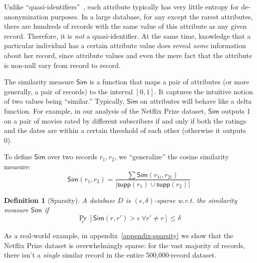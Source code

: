 \documentclass[11pt]{article}
\newcommand{\Sim}{\textsf{Sim}}
\newcommand{\supp}{\textsf{supp}}
\newtheorem{definition}{Definition}
\begin{document}
Unlike ``quasi-identifiers''~\cite{ksweeney,ciriani}, each attribute
typically has very little entropy for de-anonymization purposes.  In a
large database, for any except the rarest attributes, there are hundreds
of records with the same value of this attribute as any given record.
Therefore, it is \emph{not} a quasi-identifier.  At the same time,
knowledge that a particular individual has a certain attribute value
does reveal \emph{some} information about her record, since attribute
values and even the mere fact that the attribute is non-null vary from
record to record.


The similarity measure $\Sim$ is a function that maps a pair of attributes
(or more generally, a pair of records) to the interval $[0,1]$.  It captures the
intuitive notion of two values being ``similar.''  Typically, $\Sim$
on attributes will behave like a delta function.  For example, in our
analysis of the Netflix Prize dataset, $\Sim$ outputs 1 on a pair of
movies rated by different subscribers if and only if both the ratings
and the dates are within a certain threshold of each other (otherwise
it outputs 0).  

To define $\Sim$ over two records $r_1, r_2$, we ``generalize''
the cosine similarity measure:
$$
\Sim(r_1, r_2) = \frac{\sum \Sim(r_{1i}, r_{2i})}{|\supp(r_1) \cup \supp(r_2)|}
$$

\begin{definition}[Sparsity]
A database $D$ is $(\epsilon, \delta)$-sparse w.r.t. the
similarity measure $\Sim$ if 
$$\Pr_r[\Sim(r, r') > \epsilon\ \forall r' \neq r] \leq \delta$$
\end{definition}

As a real-world example, in appendix~\ref{appendix-sparsity} we show
that the Netflix Prize dataset is overwhelmingly sparse: for the vast
majority of records, there isn't a \emph{single} similar record in the
entire 500,000-record dataset.
\end{document}
